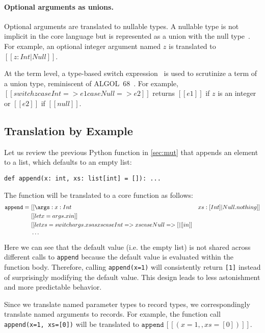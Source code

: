 \paragraph{Optional arguments as unions.}
Optional arguments are translated to nullable types. A nullable type is not
implicit in the core language but is represented as a union with the null
type~\citep{nieto2020scala}. For example, an optional integer argument named $z$
is translated to $[[{z:Int|Null}]]$.

At the term level, a type-based switch
expression~\citep{frisch2008semantic,rehman2023blend} is used to scrutinize a
term of a union type, reminiscent of ALGOL~68~\citep{van1975revised}. For
example, $[[switch z case Int => e1 case Null => e2]]$ returns $[[e1]]$ if $z$
is an integer or $[[e2]]$ if $[[null]]$.

\subsection{Translation by Example} \label{sec:example}

Let us review the previous Python function in \autoref{sec:mut} that appends an
element to a list, which defaults to an empty list:
\begin{lstlisting}[language={[3]Python}]
def append(x: int, xs: list[int] = []): ...
\end{lstlisting}
The function will be translated to a core function as follows:
\begin{align*}
\mathtt{append} =~& [[ \args: {x:Int}&{xs:[Int]|Null}. nothing]] \\
                  & [[ let x = args.x in ]] \\
                  & [[ let xs = switch args.xs as xs case Int => xs case Null => [||] in ]] \\
                  & \cdots
\end{align*}
Here we can see that the default value (i.e. the empty list) is not shared
across different calls to \lstinline{append} because the default value is
evaluated within the function body. Therefore, calling \lstinline{append(x=1)}
will consistently return \lstinline{[1]} instead of surprisingly modifying the
default value. This design leads to less astonishment and more predictable
behavior.

Since we translate named parameter types to record types, we correspondingly
translate named arguments to records. For example, the function call
\lstinline{append(x=1, xs=[0])} will be translated to {\small
$\mathtt{append}\,[[({x=1},,{xs=[0]})]]$}.

